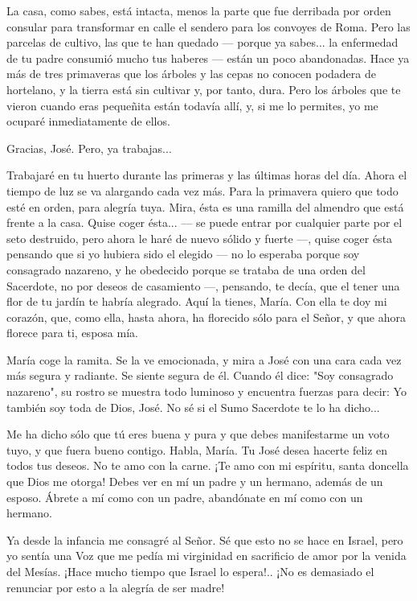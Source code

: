 \documentclass[12pt]{book} %
\begin{document}
La casa, como sabes, está intacta, menos la parte que fue derribada por orden consular para transformar en calle el sendero para los convoyes de Roma. Pero las parcelas de cultivo, las que te han quedado — porque ya sabes... la enfermedad de tu padre consumió mucho tus haberes — están un poco abandonadas. Hace ya más de tres primaveras que los árboles y las cepas no conocen podadera de hortelano, y la tierra está sin cultivar y, por tanto, dura. Pero los árboles que te vieron cuando eras pequeñita están todavía allí, y, si me lo permites, yo me ocuparé inmediatamente de ellos. 

Gracias, José. Pero, ya trabajas... 

Trabajaré en tu huerto durante las primeras y las últimas horas del día. Ahora el tiempo de luz se va alargando cada vez más. Para la primavera quiero que todo esté en orden, para alegría tuya. Mira, ésta es una ramilla del almendro que está frente a la casa. Quise coger ésta... — se puede entrar por cualquier parte por el seto destruido, pero ahora le haré de nuevo sólido y fuerte —, quise coger ésta pensando que si yo hubiera sido el elegido — no lo esperaba porque soy consagrado nazareno, y he obedecido porque se trataba de una orden del Sacerdote, no por deseos de casamiento —, pensando, te decía, que el tener una flor de tu jardín te habría alegrado. Aquí la tienes, María. Con ella te doy mi corazón, que, como ella, hasta ahora, ha florecido sólo para el Señor, y que ahora florece para ti, esposa mía. 

María coge la ramita. Se la ve emocionada, y mira a José con una cara cada vez más segura y radiante. Se siente segura de él. Cuando él dice: "Soy consagrado nazareno", su rostro se muestra todo luminoso y encuentra fuerzas para decir: Yo también soy toda de Dios, José. No sé si el Sumo Sacerdote te lo ha dicho... 

Me ha dicho sólo que tú eres buena y pura y que debes manifestarme un voto tuyo, y que fuera bueno contigo. Habla, María. Tu José desea hacerte feliz en todos tus deseos. No te amo con la carne. ¡Te amo con mi espíritu, santa doncella que Dios me otorga! Debes ver en mí un padre y un hermano, además de un esposo. Ábrete a mí como con un padre, abandónate en mí como con un hermano. 

Ya desde la infancia me consagré al Señor. Sé que esto no se hace en Israel, pero yo sentía una Voz que me pedía mi virginidad en sacrificio de amor por la venida del Mesías. ¡Hace mucho tiempo que Israel lo espera!.. ¡No es demasiado el renunciar por esto a la alegría de ser madre! 
\end{document}
